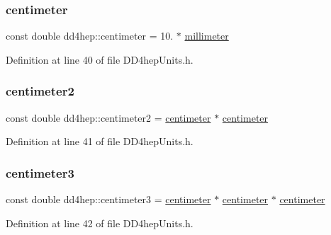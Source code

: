 \subsubsection{\texorpdfstring{centimeter}{centimeter}}
{\footnotesize\ttfamily const double dd4hep\+::centimeter = 10. $\ast$ \hyperlink{namespacedd4hep_a1b3044c28560621f033b6f0fb9a15854}{millimeter}\hspace{0.3cm}{\ttfamily [static]}}



Definition at line 40 of file D\+D4hep\+Units.\+h.

\hypertarget{namespacedd4hep_a43a537cf81dbb2fb1476264a37bb3945}{}\label{namespacedd4hep_a43a537cf81dbb2fb1476264a37bb3945} 
\subsubsection{\texorpdfstring{centimeter2}{centimeter2}}
{\footnotesize\ttfamily const double dd4hep\+::centimeter2 = \hyperlink{namespacedd4hep_af17522b334712876a204971dee26c063}{centimeter} $\ast$ \hyperlink{namespacedd4hep_af17522b334712876a204971dee26c063}{centimeter}\hspace{0.3cm}{\ttfamily [static]}}



Definition at line 41 of file D\+D4hep\+Units.\+h.

\hypertarget{namespacedd4hep_a5d565a155d7d3b225e52dc0b97c8186d}{}\label{namespacedd4hep_a5d565a155d7d3b225e52dc0b97c8186d} 
\subsubsection{\texorpdfstring{centimeter3}{centimeter3}}
{\footnotesize\ttfamily const double dd4hep\+::centimeter3 = \hyperlink{namespacedd4hep_af17522b334712876a204971dee26c063}{centimeter} $\ast$ \hyperlink{namespacedd4hep_af17522b334712876a204971dee26c063}{centimeter} $\ast$ \hyperlink{namespacedd4hep_af17522b334712876a204971dee26c063}{centimeter}\hspace{0.3cm}{\ttfamily [static]}}



Definition at line 42 of file D\+D4hep\+Units.\+h.

\hypertarget{namespacedd4hep_ab829ac901c489f46802352c5e2b3c165}{}\label{namespacedd4hep_ab829ac901c489f46802352c5e2b3c165} 
